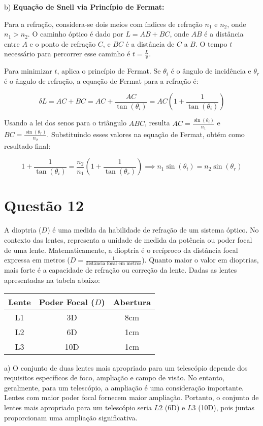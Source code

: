 \documentclass[a4paper, 12pt]{article}
\begin{document}
b) \textbf{Equação de Snell via Princípio de Fermat:}

Para a refração, considera-se dois meios com índices de refração \(n_1\) e \(n_2\), onde \(n_1 > n_2\). O caminho óptico é dado por \(L = AB + BC\), onde \(AB\) é a distância entre \(A\) e o ponto de refração \(C\), e \(BC\) é a distância de \(C\) a \(B\). O tempo \(t\) necessário para percorrer esse caminho é \(t = \frac{L}{v}\).

Para minimizar \(t\), aplica o princípio de Fermat. Se \(\theta_i\) é o ângulo de incidência e \(\theta_r\) é o ângulo de refração, a equação de Fermat para a refração é:

\[
\delta L = AC + BC = AC + \frac{AC}{\tan(\theta_i)} = AC \left(1 + \frac{1}{\tan(\theta_i)}\right)
\]

Usando a lei dos senos para o triângulo \(ABC\), resulta \(AC = \frac{\sin(\theta_i)}{n_1}\) e \(BC = \frac{\sin(\theta_r)}{n_2}\). Substituindo esses valores na equação de Fermat, obtém como resultado final:

\[
1 + \frac{1}{\tan(\theta_i)} = \frac{n_2}{n_1} \left(1 + \frac{1}{\tan(\theta_r)}\right) \implies n_1 \sin(\theta_i) = n_2 \sin(\theta_r)
\]

\section*{Questão 12}

A dioptria (\(D\)) é uma medida da habilidade de refração de um sistema óptico. No contexto das lentes, representa a unidade de medida da potência ou poder focal de uma lente. Matematicamente, a dioptria é o recíproco da distância focal expressa em metros (\(D = \frac{1}{\text{distância focal em metros}}\)). Quanto maior o valor em dioptrias, mais forte é a capacidade de refração ou correção da lente. Dadas as lentes apresentadas na tabela abaixo:

\begin{center}
\begin{tabular}{|c|c|c|}
\hline
Lente & Poder Focal (\(D\)) & Abertura \\
\hline
L1 & 3D & 8cm \\
L2 & 6D & 1cm \\
L3 & 10D & 1cm \\
\hline
\end{tabular}
\end{center}

a) O conjunto de duas lentes mais apropriado para um telescópio depende dos requisitos específicos de foco, ampliação e campo de visão. No entanto, geralmente, para um telescópio, a ampliação é uma consideração importante. Lentes com maior poder focal fornecem maior ampliação. Portanto, o conjunto de lentes mais apropriado para um telescópio seria \(L2\) (6D) e \(L3\) (10D), pois juntas proporcionam uma ampliação significativa.
\end{document}
